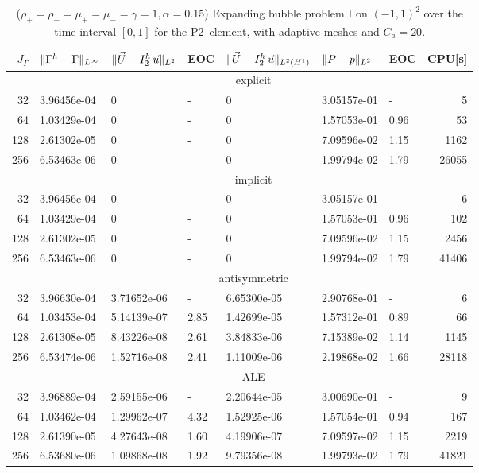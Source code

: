 \begin{table}
\center
\hspace*{-3.25cm}
\begin{tabular}{rllllllr}
\hline
$J_\Gamma$ & $\|\Gamma^h - \Gamma\|_{L^\infty}$ & $\|\vec U - I^h_{2}\,\vec u\|_{L^2}$ & EOC & $\|\vec U - I^h_{2}\,\vec u\|_{L^2(H^1)}$ & $\|P - p\|_{L^2}$ & EOC
& CPU[s] \\
\hline
& \multicolumn{7}{c}{explicit} \\
\hline
 32 & 3.96456e-04 & 0 & - & 0 & 3.05157e-01 &    - &     5 \\
 64 & 1.03429e-04 & 0 & - & 0 & 1.57053e-01 & 0.96 &    53 \\
128 & 2.61302e-05 & 0 & - & 0 & 7.09596e-02 & 1.15 &  1162 \\
256 & 6.53463e-06 & 0 & - & 0 & 1.99794e-02 & 1.79 & 26055 \\
\hline
& \multicolumn{7}{c}{implicit} \\
\hline
 32 & 3.96456e-04 & 0 & - & 0 & 3.05157e-01 &    - &     6 \\
 64 & 1.03429e-04 & 0 & - & 0 & 1.57053e-01 & 0.96 &   102 \\
128 & 2.61302e-05 & 0 & - & 0 & 7.09596e-02 & 1.15 &  2456 \\
256 & 6.53463e-06 & 0 & - & 0 & 1.99794e-02 & 1.79 & 41406 \\
\hline
& \multicolumn{7}{c}{antisymmetric} \\
\hline
 32 & 3.96630e-04 & 3.71652e-06 &    - & 6.65300e-05 & 2.90768e-01 &    - &
6 \\
 64 & 1.03453e-04 & 5.14139e-07 & 2.85 & 1.42699e-05 & 1.57312e-01 & 0.89 &
66 \\
128 & 2.61308e-05 & 8.43226e-08 & 2.61 & 3.84833e-06 & 7.15389e-02 & 1.14 &
1145 \\
256 & 6.53474e-06 & 1.52716e-08 & 2.41 & 1.11009e-06 & 2.19868e-02 & 1.66 &
28118 \\
\hline
& \multicolumn{7}{c}{ALE} \\
\hline
 32 & 3.96889e-04 & 2.59155e-06 &    - & 2.20644e-05 & 3.00690e-01 &    - &
9 \\
 64 & 1.03462e-04 & 1.29962e-07 & 4.32 & 1.52925e-06 & 1.57054e-01 & 0.94 &
167 \\
128 & 2.61390e-05 & 4.27643e-08 & 1.60 & 4.19906e-07 & 7.09597e-02 & 1.15 &
2219 \\
256 & 6.53680e-06 & 1.09868e-08 & 1.92 & 9.79356e-08 & 1.99793e-02 & 1.79 &
41821 \\
\hline
\end{tabular}
\hspace*{-3.25cm}
\caption[Navier--Stokes expanding bubble I errors P2--\pdg]
{($\rho_+ = \rho_- = \mu_+ = \mu_- = \gamma = 1,\alpha=0.15$)
Expanding bubble problem I on $(-1,1)^2$ over the time interval $[0,1]$ for the
P2--\pdg element, with adaptive meshes and $C_a=20$\textdegree.}
\label{tab:nsexpandingbubbleIp2p1dg}
\end{table}
